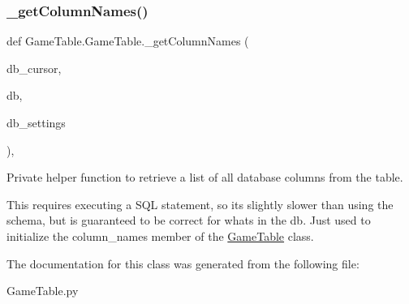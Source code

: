 \subsubsection{\texorpdfstring{\_getColumnNames()}{\_getColumnNames()}}
{\footnotesize\ttfamily def Game\+Table.\+Game\+Table.\+\_\+get\+Column\+Names (\begin{DoxyParamCaption}\item[{}]{db\+\_\+cursor,  }\item[{}]{db,  }\item[{}]{db\+\_\+settings }\end{DoxyParamCaption})\hspace{0.3cm}{\ttfamily [static]}, {\ttfamily [private]}}



Private helper function to retrieve a list of all database columns from the table. 

This requires executing a S\+QL statement, so it\textquotesingle{}s slightly slower than using the schema, but is guaranteed to be correct for what\textquotesingle{}s in the db. Just used to initialize the column\+\_\+names member of the \mbox{\hyperlink{class_game_table_1_1_game_table}{Game\+Table}} class. 

The documentation for this class was generated from the following file\+:\begin{DoxyCompactItemize}
\item 
Game\+Table.\+py\end{DoxyCompactItemize}
